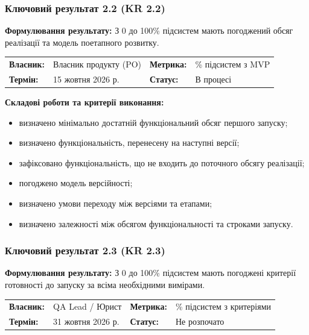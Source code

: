 \documentclass{article}
\begin{document}
\subsubsection{Ключовий результат 2.2 (KR 2.2)}

\textbf{Формулювання результату:} З 0 до 100\% підсистем мають погоджений обсяг реалізації та модель поетапного розвитку.

\noindent\begin{tabular}{@{}p{2.2cm}p{4.5cm}p{2.2cm}p{4.5cm}@{}}
\toprule
\textbf{Власник:} & Власник продукту (PO) & \textbf{Метрика:} & \% підсистем з MVP \\
\textbf{Термін:} & 15 жовтня 2026 р. & \textbf{Статус:} & В процесі \\
\bottomrule
\end{tabular}

\vspace{10pt}
\textbf{Складові роботи та критерії виконання:}
\begin{itemize}
    \item визначено мінімально достатній функціональний обсяг першого запуску;
    \item визначено функціональність, перенесену на наступні версії;
    \item зафіксовано функціональність, що не входить до поточного обсягу реалізації;
    \item погоджено модель версійності;
    \item визначено умови переходу між версіями та етапами;
    \item визначено залежності між обсягом функціональності та строками запуску.
\end{itemize}

\subsubsection{Ключовий результат 2.3 (KR 2.3)}

\textbf{Формулювання результату:} З 0 до 100\% підсистем мають погоджені критерії готовності до запуску за всіма необхідними вимірами.

\noindent\begin{tabular}{@{}p{2.2cm}p{4.5cm}p{2.2cm}p{4.5cm}@{}}
\toprule
\textbf{Власник:} & QA Lead / Юрист & \textbf{Метрика:} & \% підсистем з критеріями \\
\textbf{Термін:} & 31 жовтня 2026 р. & \textbf{Статус:} & Не розпочато \\
\bottomrule
\end{tabular}
\end{document}

